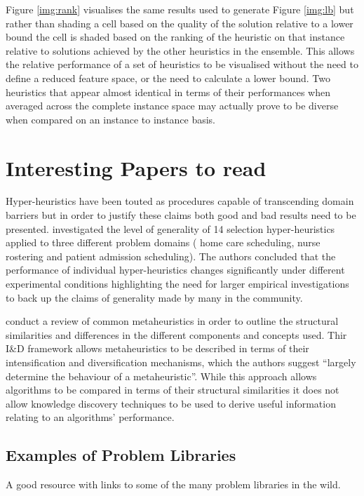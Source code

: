 \documentclass[a4paper]{article}
\begin{document}
Figure \ref{img:rank} visualises the same results used to generate Figure \ref{img:lb} but rather than shading a cell based on the quality of the solution relative to a lower bound the cell is shaded based on the ranking of the heuristic on that instance relative to solutions achieved by the other heuristics in the ensemble. 
This allows the relative performance of a set of heuristics to be visualised without the need to define a reduced feature space, or the need to calculate a lower bound. Two heuristics that appear almost identical in terms of their performances when averaged across the complete instance space may actually prove to be diverse when compared on an instance to instance basis.

\section*{Interesting Papers to read}

Hyper-heuristics have been touted as procedures capable of transcending domain barriers but in order to justify these claims both good and bad results need to be presented. \cite{Misir20133335} investigated the level of generality of 14 selection hyper-heuristics applied to three different problem domains (
home care scheduling, nurse rostering and patient admission scheduling). The authors concluded that the performance of individual hyper-heuristics changes significantly under different experimental conditions highlighting the need for larger empirical investigations to back up the claims of generality made by many in the community.

\cite{Blum2003} conduct a review of common metaheuristics in order to outline the structural similarities and differences in the different components and concepts used.
Thir I\&D framework allows metaheuristics to be described in terms of their intensification and diversification mechanisms, which the authors suggest ``largely determine the behaviour of a metaheuristic''. While this approach allows algorithms to be compared in terms of their structural similarities it does not allow knowledge discovery techniques to be used to derive useful information relating to an algorithms' performance.

\subsection{Examples of Problem Libraries}

A good resource with links to some of the many problem libraries in the wild.
\end{document}

